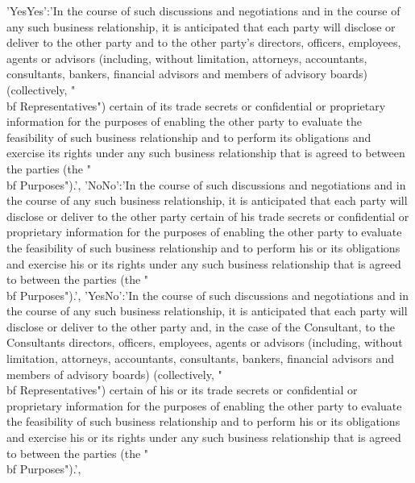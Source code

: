 \documentclass[12pt]{article}
\newcommand{\VAR}[1]{{\color{blue}#1}}
\begin{document}
 \VAR{
    {
        'YesYes':'In the course of such discussions and negotiations and in the course of any such business relationship, it is anticipated that each party will disclose or deliver to the other party and to the other party’s directors, officers, employees, agents or advisors (including, without limitation, attorneys, accountants, consultants, bankers, financial advisors and members of advisory boards) (collectively, "{\\bf Representatives}") certain of its trade secrets or confidential or proprietary information for the purposes of enabling the other party to evaluate the feasibility of such business relationship and to perform its obligations and exercise its rights under any such business relationship that is agreed to between the parties (the "{\\bf Purposes}").',
        'NoNo':'In the course of such discussions and negotiations and in the course of any such business relationship, it is anticipated that each party will disclose or deliver to the other party certain of his trade secrets or confidential or proprietary information for the purposes of enabling the other party to evaluate the feasibility of such business relationship and to perform his or its obligations and exercise his or its rights under any such business relationship that is agreed to between the parties (the "{\\bf Purposes}").',
        'YesNo':'In the course of such discussions and negotiations and in the course of any such business relationship, it is anticipated that each party will disclose or deliver to the other party and, in the case of the Consultant, to the Consultants directors, officers, employees, agents or advisors (including, without limitation, attorneys, accountants, consultants, bankers, financial advisors and members of advisory boards) (collectively, "{\\bf Representatives}") certain of his or its trade secrets or confidential or proprietary information for the purposes of enabling the other party to evaluate the feasibility of such business relationship and to perform his or its obligations and exercise his or its rights under any such business relationship that is agreed to between the parties (the "{\\bf Purposes}").',
}}
\end{document}
